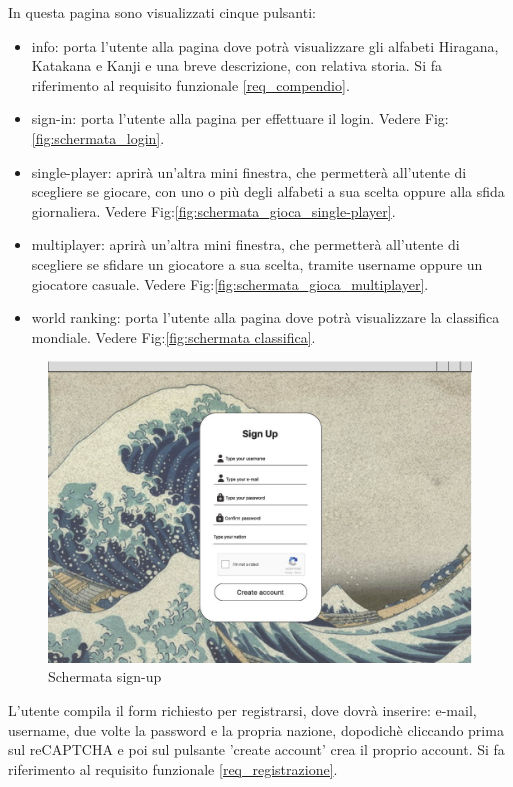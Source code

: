 In questa pagina sono visualizzati cinque pulsanti:
\begin{itemize}
    \item info: porta l'utente alla pagina dove potrà visualizzare gli alfabeti Hiragana, Katakana e Kanji e una breve descrizione, con relativa storia. Si fa riferimento al requisito funzionale \ref{req_compendio}.
    \item sign-in: porta l'utente alla pagina per effettuare il login. Vedere Fig:\ref{fig:schermata_login}.
    \item single-player: aprirà un'altra mini finestra, che permetterà all'utente di scegliere se giocare, con uno o più degli alfabeti a sua scelta oppure alla sfida giornaliera. Vedere Fig:\ref{fig:schermata_gioca_single-player}.
    \item multiplayer: aprirà un'altra mini finestra, che permetterà all'utente di scegliere se sfidare un giocatore a sua scelta, tramite username oppure un giocatore casuale. Vedere Fig:\ref{fig:schermata_gioca_multiplayer}.
    \item world ranking: porta l'utente alla pagina dove potrà visualizzare la classifica mondiale. Vedere Fig:\ref{fig:schermata classifica}.
\end{itemize}

\begin{figure}[!h]
\centering
\includegraphics[scale=0.35]{images/signup.jpg}
\caption{Schermata sign-up}
\label{fig:schermata_signup}
\end{figure}
\noindent 
L'utente compila il form richiesto per registrarsi, dove dovrà inserire: e-mail, username, due volte la password e la propria nazione, dopodichè cliccando prima sul reCAPTCHA e poi sul pulsante 'create account' crea il proprio account. Si fa riferimento al requisito funzionale \ref{req_registrazione}. \\
\newpage

